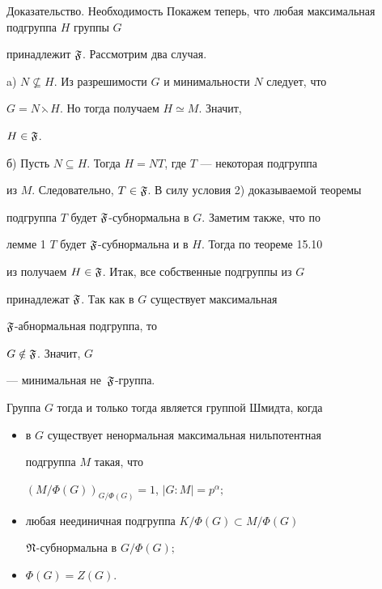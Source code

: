 \begin{pf*}{Доказательство. Необходимость}
Покажем теперь, что любая максимальная подгруппа $H$ группы $G$


принадлежит $\frak F$. Рассмотрим два случая.





a) $N\nsubseteq H$. Из разрешимости $G$ и минимальности $N$ следует, что


$G=N\leftthreetimes H$. Но тогда получаем $H\simeq M$. Значит,


$H\in\frak F$.





б) Пусть $N\subseteq H$. Тогда $H=NT$, где $T$ --- некоторая подгруппа


из $M$. Следовательно, $T\in\frak F$. В силу условия 2) доказываемой теоремы


подгруппа $T$ будет $\frak F$-субнормальна в $G$. Заметим также, что по


лемме 1\; $T$ будет $\frak F$-субнормальна и в $H$. Тогда по теореме 15.10


из \cite{S2} получаем $H\in\frak F$. Итак, все собственные подгруппы из $G$


принадлежат $\frak F$. Так как в $G$ существует максимальная


$\frak F$-абнормальная подгруппа, то


$G\notin\frak F$. Значит, $G$


--- минимальная не~$\frak F$-группа.


\end{pf*}





\begin{cor}


Группа $G$ тогда и только тогда является группой Шмидта, когда


\begin{itemize}


\item[1)] в $G$ существует ненормальная максимальная нильпотентная


подгруппа $M$ такая, что


$(M/\Phi(G))_{G/\Phi(G)}=1$, $|G{:}M|=p^\alpha;$


\item[2)] любая неединичная подгруппа $K/\Phi(G)\subset M/\Phi(G)$\;


$\frak N$-субнормальна в $G/\Phi(G);$


\item[3)] $\Phi(G)=Z(G)$.


\end{itemize}


\end{cor}





